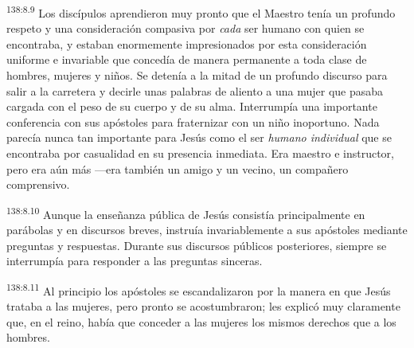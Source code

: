 \par 
\textsuperscript{138:8.9} Los discípulos aprendieron muy pronto que el Maestro tenía un profundo respeto y una consideración compasiva por \textit{cada} ser humano con quien se encontraba, y estaban enormemente impresionados por esta consideración uniforme e invariable que concedía de manera permanente a toda clase de hombres, mujeres y niños. Se detenía a la mitad de un profundo discurso para salir a la carretera y decirle unas palabras de aliento a una mujer que pasaba cargada con el peso de su cuerpo y de su alma. Interrumpía una importante conferencia con sus apóstoles para fraternizar con un niño inoportuno. Nada parecía nunca tan importante para Jesús como el ser \textit{humano individual} que se encontraba por casualidad en su presencia inmediata. Era maestro e instructor, pero era aún más ---era también un amigo y un vecino, un compañero comprensivo.

\par 
\textsuperscript{138:8.10} Aunque la enseñanza pública de Jesús consistía principalmente en parábolas y en discursos breves, instruía invariablemente a sus apóstoles mediante preguntas y respuestas. Durante sus discursos públicos posteriores, siempre se interrumpía para responder a las preguntas sinceras.

\par 
\textsuperscript{138:8.11} Al principio los apóstoles se escandalizaron por la manera en que Jesús trataba a las mujeres, pero pronto se acostumbraron; les explicó muy claramente que, en el reino, había que conceder a las mujeres los mismos derechos que a los hombres.

